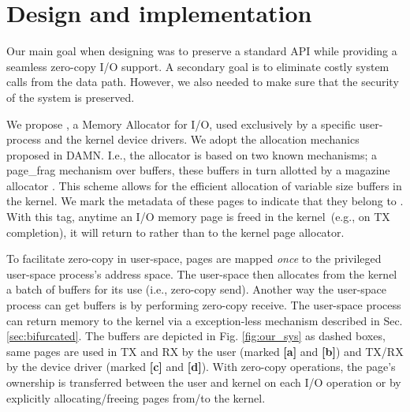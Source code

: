 
\section{Design and implementation}\label{sec:design}
Our main goal when designing \oursys was to preserve a standard \sockets API while providing a seamless zero-copy I/O support. A secondary goal is to eliminate costly system calls from the data path. However, we also needed to make sure that the security of the system is preserved.



We propose \oursys, a Memory Allocator for I/O, used exclusively by a specific user-process and the kernel device drivers. 
We adopt the allocation mechanics proposed in DAMN\cite{markuze2018damn}. I.e., the allocator is based on two known mechanisms; a page\_frag mechanism \cite{pagefrag} over \size buffers, these buffers in turn allotted by a magazine allocator \cite{bonwick2001magazines}. This scheme allows for the efficient allocation of variable size buffers in the kernel. 
We mark the metadata of these \oursys pages to indicate that they belong to \oursys. With this tag, anytime an I/O  memory page is freed in the kernel~(e.g., on TX completion), it will return to \oursys rather than to the kernel page allocator. 

To facilitate zero-copy in user-space, \oursys pages are mapped \emph{once} to the privileged user-space process's address space. The user-space then allocates from the kernel a batch of buffers for its use (i.e., zero-copy send). Another way the user-space process can get \oursys buffers is by performing zero-copy receive. The user-space process can return memory to the kernel via a exception-less mechanism described in Sec. \ref{sec:bifurcated}.
The \oursys buffers are depicted in Fig. \ref{fig:our_sys} as dashed boxes, same pages are used in TX and RX by the user (marked \textbf{[a]} and \textbf{[b]}) and TX/RX by the device driver (marked \textbf{[c]} and \textbf{[d]}). With zero-copy operations, the page's ownership is transferred between the user and kernel on each I/O operation or by explicitly allocating/freeing pages from/to the kernel.
